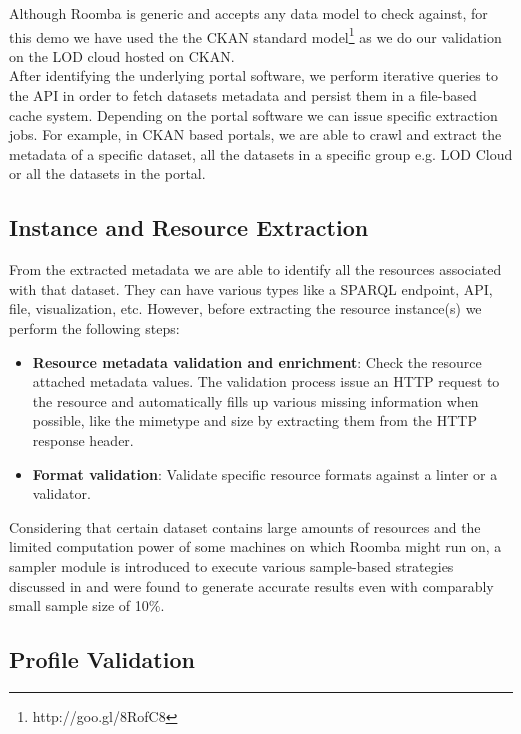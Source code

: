 \documentclass{sig-alternate}
\begin{document}
Although Roomba is generic and accepts any data model to check against, for this demo we have used the the CKAN standard model\footnote{http://goo.gl/8RofC8} as we do our validation on the LOD cloud hosted on CKAN.\\

After identifying the underlying portal software, we perform iterative queries to the API in order to fetch datasets metadata and persist them in a file-based cache system.
Depending on the portal software we can issue specific extraction jobs. For example, in CKAN based portals, we are able to crawl and extract the metadata of a specific dataset, all the datasets in a specific group e.g. LOD Cloud or all the datasets in the portal.

\subsection{Instance and Resource Extraction}

From the extracted metadata we are able to identify all the resources associated with that dataset. They can have various types like a SPARQL endpoint, API, file, visualization, etc. However, before extracting the resource instance(s) we perform the following steps:

\begin{itemize}
  \item \textbf{Resource metadata validation and enrichment}: Check the resource attached metadata values. The validation process issue an HTTP request to the resource and automatically fills up various missing information when possible, like the mimetype and size by extracting them from the HTTP response header.
  \item \textbf{Format validation}: Validate specific resource formats against a linter or a validator.
\end{itemize}

Considering that certain dataset contains large amounts of resources and the limited computation power of some machines on which Roomba might run on, a sampler module is introduced to execute various sample-based strategies discussed in \cite{scalableApproach} and were found to generate accurate results even with comparably small sample size of 10\%.

\subsection{Profile Validation}
\end{document}
